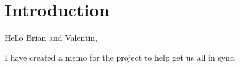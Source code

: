 \documentclass[11pt]{article}
\begin{document}
	\section{Introduction}
	Hello Brian and Valentin,

	I have created a memo for the project to help get us all in sync.
	
	
	
	
	
\end{document}
